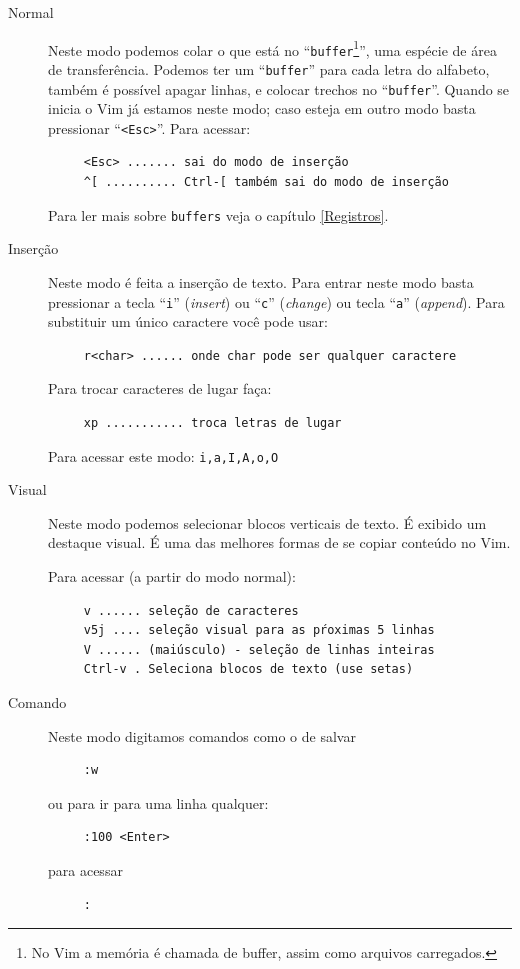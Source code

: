 \documentclass[10pt,a4paper,openany]{book}
\begin{document}
\begin{description}

\item [Normal] Neste modo podemos colar o que está no
 ``\verb|buffer|\footnote{No Vim a memória é chamada de buffer, assim como
 arquivos carregados.}'', uma espécie de área de transferência. Podemos ter um
 ``\verb|buffer|'' para cada letra do alfabeto, também é possível apagar linhas, e
 colocar trechos no ``\verb|buffer|''. Quando se inicia o Vim já estamos neste modo;
 caso esteja em outro modo basta pressionar ``\verb|<Esc>|''.  Para acessar:

\begin{verbatim}
     <Esc> ....... sai do modo de inserção
     ^[ .......... Ctrl-[ também sai do modo de inserção
\end{verbatim}

Para ler mais sobre \verb|buffers| veja o capítulo \ref{Registros}.

\item [Inserção]
Neste modo é feita a inserção de texto. Para entrar neste modo basta
pressionar a tecla ``\verb|i|'' ({\em insert}) ou ``\verb|c|'' ({\em change})
ou tecla ``\verb|a|'' ({\em append}).  Para substituir um único caractere você
pode usar:

\begin{verbatim}
     r<char> ...... onde char pode ser qualquer caractere
\end{verbatim}

Para trocar caracteres de lugar faça:

\begin{verbatim}
     xp ........... troca letras de lugar
\end{verbatim}


Para acessar este modo:  \verb+i,a,I,A,o,O+

\item [Visual] Neste modo podemos selecionar blocos verticais de texto. É
exibido um destaque visual. É uma das melhores formas de se copiar
conteúdo no Vim.

Para acessar (a partir do modo normal):

\begin{verbatim}
     v ...... seleção de caracteres
     v5j .... seleção visual para as pŕoximas 5 linhas
     V ...... (maiúsculo) - seleção de linhas inteiras
     Ctrl-v . Seleciona blocos de texto (use setas)
\end{verbatim}

\item [Comando] Neste modo digitamos comandos como o de salvar

\begin{verbatim}
     :w
\end{verbatim}

ou para ir para uma linha qualquer:

\begin{verbatim}
     :100 <Enter>
\end{verbatim}

para acessar
\begin{verbatim}
     :
\end{verbatim}

\end{description}
\end{document}

